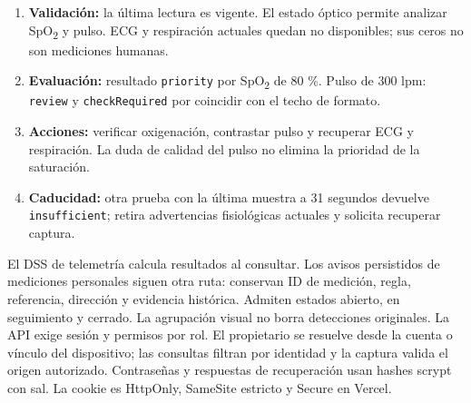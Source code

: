 \begin{enumerate}[leftmargin=5mm,itemsep=5pt]
\item \textbf{Validación:} la última lectura es vigente. El estado óptico permite analizar SpO\textsubscript{2} y pulso. ECG y respiración actuales quedan no disponibles; sus ceros no son mediciones humanas.
\item \textbf{Evaluación:} resultado \texttt{priority} por SpO\textsubscript{2} de 80 \%. Pulso de 300 lpm: \texttt{review} y \texttt{checkRequired} por coincidir con el techo de formato.
\item \textbf{Acciones:} verificar oxigenación, contrastar pulso y recuperar ECG y respiración. La duda de calidad del pulso no elimina la prioridad de la saturación.
\item \textbf{Caducidad:} otra prueba con la última muestra a 31 segundos devuelve \texttt{insufficient}; retira advertencias fisiológicas actuales y solicita recuperar captura.
\end{enumerate}
El DSS de telemetría calcula resultados al consultar. Los avisos persistidos de mediciones personales siguen otra ruta: conservan ID de medición, regla, referencia, dirección y evidencia histórica. Admiten estados abierto, en seguimiento y cerrado. La agrupación visual no borra detecciones originales.
La API exige sesión y permisos por rol. El propietario se resuelve desde la cuenta o vínculo del dispositivo; las consultas filtran por identidad y la captura valida el origen autorizado. Contraseñas y respuestas de recuperación usan hashes scrypt con sal. La cookie es HttpOnly, SameSite estricto y Secure en Vercel.

